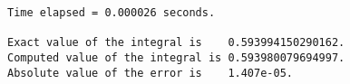 \documentclass[11pt]{article}
\begin{document}
    \begin{Verbatim}[commandchars=\\\{\}]
Time elapsed = 0.000026 seconds.

Exact value of the integral is    0.593994150290162.
Computed value of the integral is 0.593980079694997.
Absolute value of the error is    1.407e-05.

    \end{Verbatim}


    
    
    
    
\end{document}
